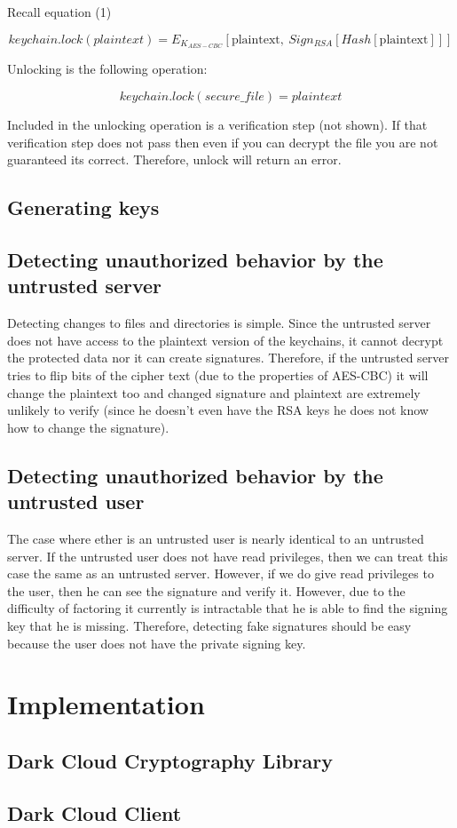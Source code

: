 \documentclass[a4paper]{article}
\begin{document}
Recall equation (1)

\begin{equation}
 keychain.lock(plaintext) = E_{K_{AES-CBC}}[\text{plaintext} , \ Sign_{RSA} [Hash[\text{plaintext}] ] ] \tag{1}\label{eq:simple}
\end{equation}

Unlocking is the following operation:

\begin{equation}
keychain.lock(secure\_file) = plaintext
\end{equation}

Included in the unlocking operation is a verification step (not shown). If that verification step does not pass then even if you can decrypt the file you are not guaranteed its correct. Therefore, unlock will return an error.

\subsection{Generating keys}

\subsection{Detecting unauthorized behavior by the untrusted server}

Detecting changes to files and directories is simple. Since the untrusted server does not have access to the plaintext version of the keychains, it cannot decrypt the protected data nor it can create signatures. Therefore, if the untrusted server tries to flip bits of the cipher text (due to the properties of AES-CBC) it will change the plaintext too and changed signature and plaintext are extremely unlikely to verify (since he doesn't even have the RSA keys he does not know how to change the signature).

\subsection{Detecting unauthorized behavior by the untrusted user}

The case where ether is an untrusted user is nearly identical to an untrusted server. If the untrusted user does not have read privileges, then we can treat this case the same as an untrusted server. However, if we do give read privileges to the user, then he can see the signature and verify it. However, due to the difficulty of factoring it currently is intractable that he is able to find the signing key that he is missing. Therefore, detecting fake signatures should be easy because the user does not have the private signing key.


\section{Implementation}

\subsection{Dark Cloud Cryptography Library}

\subsection{Dark Cloud Client}
\end{document}
